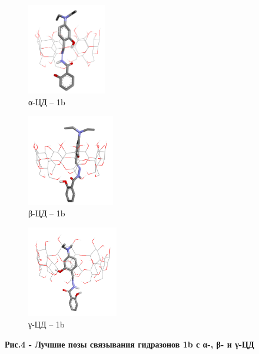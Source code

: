\begin{figure}[H]
    \centering
    \begin{subfigure}[t]{0.3\textwidth}
        \centering
        \includegraphics[width=\textwidth, height=4cm]{media/chem2/image55}
        \caption*{α-ЦД -- 1b}
    \end{subfigure}
    \begin{subfigure}[t]{0.3\textwidth}
        \centering
        \includegraphics[width=\textwidth, height=4cm]{media/chem2/image56}
        \caption*{β-ЦД -- 1b}
    \end{subfigure}
    \begin{subfigure}[t]{0.3\textwidth}
        \centering
        \includegraphics[width=\textwidth, height=4cm]{media/chem2/image57}
        \caption*{γ-ЦД -- 1b}
    \end{subfigure}
    \caption*{{\bfseries Рис.4 - Лучшие позы связывания гидразонов 1b с α-, β- и γ-ЦД}}
\end{figure}

